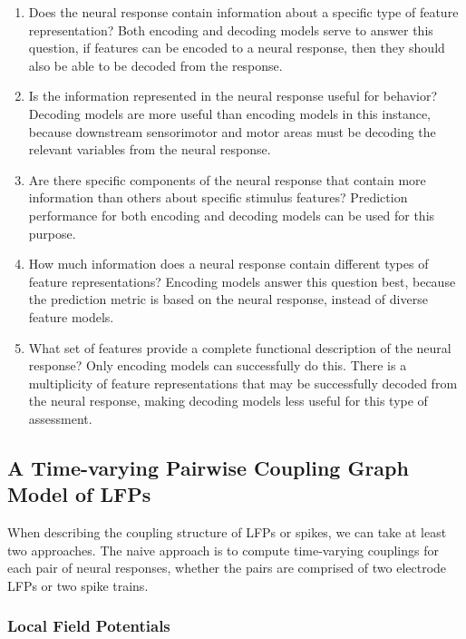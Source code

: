 \documentclass[12pt,article,oneside]{memoir}
\begin{document}
\begin{enumerate}

\item
Does the neural response contain information about a specific type of feature representation?
Both encoding and decoding models serve to answer this question, if features can be encoded
to a neural response, then they should also be able to be decoded from the response.

\item
Is the information represented in the neural response useful for behavior? Decoding models are
more useful than encoding models in this instance, because downstream sensorimotor and motor
areas must be decoding the relevant variables from the neural response.

\item
Are there specific components of the neural response that contain more information than others
about specific stimulus features? Prediction performance for both encoding and decoding models
can be used for this purpose.

\item
How much information does a neural response contain different types of feature representations?
Encoding models answer this question best, because the prediction metric is based on the neural
response, instead of diverse feature models.

\item
What set of features provide a complete functional description of the neural response? Only
encoding models can successfully do this. There is a multiplicity of feature representations
that may be successfully decoded from the neural response, making decoding models less useful
for this type of assessment.

\end{enumerate}

\subsection{A Time-varying Pairwise Coupling Graph Model of LFPs}
\label{sec:constructing_coupling_graphs}

When describing the coupling structure of LFPs or spikes, we can take at least two approaches. The
naive approach is to compute time-varying couplings for each pair of neural responses,
whether the pairs are comprised of two electrode LFPs or two spike trains.

\subsubsection{Local Field Potentials}
\end{document}
